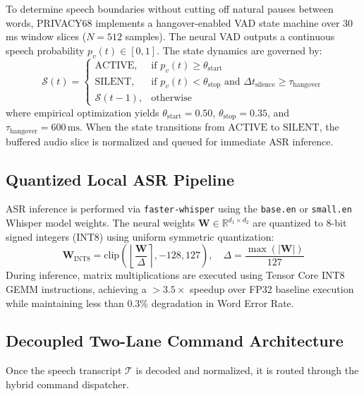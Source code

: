 \documentclass[conference]{IEEEtran}
\begin{document}
To determine speech boundaries without cutting off natural pauses between words, PRIVACY68 implements a hangover-enabled VAD state machine over 30\,ms window slices ($N=512$ samples). The neural VAD outputs a continuous speech probability $p_v(t) \in [0, 1]$. The state dynamics are governed by:
\begin{equation}
\mathcal{S}(t) = \begin{cases}
\text{ACTIVE}, & \text{if } p_v(t) \ge \theta_{\text{start}} \\
\text{SILENT}, & \text{if } p_v(t) < \theta_{\text{stop}} \text{ and } \Delta t_{\text{silence}} \ge \tau_{\text{hangover}} \\
\mathcal{S}(t-1), & \text{otherwise}
\end{cases}
\end{equation}
where empirical optimization yields $\theta_{\text{start}} = 0.50$, $\theta_{\text{stop}} = 0.35$, and $\tau_{\text{hangover}} = 600\,\text{ms}$. When the state transitions from $\text{ACTIVE}$ to $\text{SILENT}$, the buffered audio slice is normalized and queued for immediate ASR inference.

\subsection{Quantized Local ASR Pipeline}
ASR inference is performed via \texttt{faster-whisper} using the \texttt{base.en} or \texttt{small.en} Whisper model weights. The neural weights $\mathbf{W} \in \mathbb{R}^{d_1 \times d_2}$ are quantized to 8-bit signed integers (INT8) using uniform symmetric quantization:
\begin{equation}
\mathbf{W}_{\text{INT8}} = \text{clip}\left(\left\lfloor \frac{\mathbf{W}}{\Delta} \right\rceil, -128, 127\right), \quad \Delta = \frac{\max(|\mathbf{W}|)}{127}
\end{equation}
During inference, matrix multiplications are executed using Tensor Core INT8 GEMM instructions, achieving a $>3.5\times$ speedup over FP32 baseline execution while maintaining less than 0.3\% degradation in Word Error Rate.

\subsection{Decoupled Two-Lane Command Architecture}
Once the speech transcript $\mathcal{T}$ is decoded and normalized, it is routed through the hybrid command dispatcher.
\end{document}
